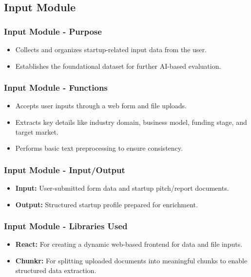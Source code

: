 \documentclass{beamer}
\begin{document}
\subsection{Input Module}

\begin{frame}
\frametitle{Input Module - Purpose}
\begin{itemize}
    \item Collects and organizes startup-related input data from the user.
    \item Establishes the foundational dataset for further AI-based evaluation.
\end{itemize}
\end{frame}

\begin{frame}
\frametitle{Input Module - Functions}
\begin{itemize}
    \item Accepts user inputs through a web form and file uploads.
    \item Extracts key details like industry domain, business model, funding stage, and target market.
    \item Performs basic text preprocessing to ensure consistency.
\end{itemize}
\end{frame}

\begin{frame}
\frametitle{Input Module - Input/Output}
\begin{itemize}
    \item \textbf{Input:} User-submitted form data and startup pitch/report documents.
    \item \textbf{Output:} Structured startup profile prepared for enrichment.
\end{itemize}
\end{frame}

\begin{frame}
\frametitle{Input Module - Libraries Used}
\begin{itemize}
    \item \textbf{React:} For creating a dynamic web-based frontend for data and file inputs.
    \item \textbf{Chunkr:} For splitting uploaded documents into meaningful chunks to enable structured data extraction.
\end{itemize}
\end{frame}
\end{document}

